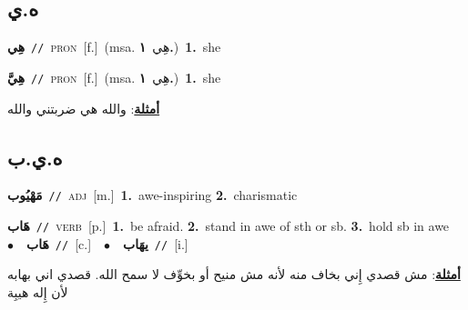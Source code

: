 \documentclass[10pt,a4paper,twoside]{article} %
\begin{document}
\begin{multicols}{2}
\vspace{-3mm}
\subsection*{\color{blue}\foreignlanguage{arabic}{ه.ي}\color{blue}{ (ntws)}} 

{\setlength\topsep{0pt}\textbf{\foreignlanguage{arabic}{هِي}}\ {\color{gray}\texttt{//}\color{black}}\ \textsc{pron}\ [f.]\ \color{gray}(msa. \foreignlanguage{arabic}{هِي}~\foreignlanguage{arabic}{\textbf{١.}})\color{black}\ \textbf{1.}~she\ } \vspace{2mm}

{\setlength\topsep{0pt}\textbf{\foreignlanguage{arabic}{هِيَّ}}\ {\color{gray}\texttt{//}\color{black}}\ \textsc{pron}\ [f.]\ \color{gray}(msa. \foreignlanguage{arabic}{هِي}~\foreignlanguage{arabic}{\textbf{١.}})\color{black}\ \textbf{1.}~she\  \begin{flushright}\color{gray}\foreignlanguage{arabic}{\textbf{\underline{\foreignlanguage{arabic}{أمثلة}}}: والله هي ضربتني والله}\end{flushright}\color{black}} \vspace{2mm}

\vspace{-3mm}
\subsection*{\color{blue}\foreignlanguage{arabic}{ه.ي.ب}\color{blue}{}} 

{\setlength\topsep{0pt}\textbf{\foreignlanguage{arabic}{مَهْيُوب}}\ {\color{gray}\texttt{//}\color{black}}\ \textsc{adj}\ [m.]\ \textbf{1.}~awe-inspiring  \textbf{2.}~charismatic\ } \vspace{2mm}

{\setlength\topsep{0pt}\textbf{\foreignlanguage{arabic}{هَاب}}\ {\color{gray}\texttt{//}\color{black}}\ \textsc{verb}\ [p.]\ \textbf{1.}~be afraid.  \textbf{2.}~stand in awe of sth or sb.  \textbf{3.}~hold sb in awe\ \ $\bullet$\ \ \setlength\topsep{0pt}\textbf{\foreignlanguage{arabic}{هَاب}}\ {\color{gray}\texttt{//}\color{black}}\ [c.]\ \ $\bullet$\ \ \setlength\topsep{0pt}\textbf{\foreignlanguage{arabic}{يهَاب}}\ {\color{gray}\texttt{//}\color{black}}\ [i.]\  \begin{flushright}\color{gray}\foreignlanguage{arabic}{\textbf{\underline{\foreignlanguage{arabic}{أمثلة}}}: مش قصدي إِني بخاف منه لأنه مش منيح أو بخوِّف لا سمح الله. قصدي اني بهابه لأن إِله هيبِة}\end{flushright}\color{black}} \vspace{2mm}


\end{multicols}
\end{document}

